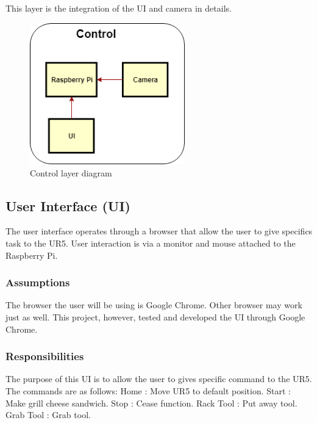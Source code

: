 This layer is the integration of the UI and camera in details.

\begin{figure}[h!]
	\centering
 	\includegraphics[width=0.60\textwidth]{images/Control_Layer}
 \caption{Control layer diagram}
\end{figure}

\subsection{User Interface (UI)}
The user interface operates through a browser that allow the user to give specifics task to the UR5. User interaction is via a monitor and mouse attached to the Raspberry Pi.

\subsubsection{Assumptions}
The browser the user will be using is Google Chrome. Other browser may work just as well. This project, however, tested and developed the UI through Google Chrome.

\subsubsection{Responsibilities}
The purpose of this UI is to allow the user to gives specific command to the UR5. The commands are as follows:
\newline Home  		: Move UR5 to default position.
\newline Start 		: Make grill cheese sandwich.
\newline Stop  		: Cease function.
\newline Rack Tool 	: Put away tool.
\newline Grab Tool 	: Grab tool.
	
